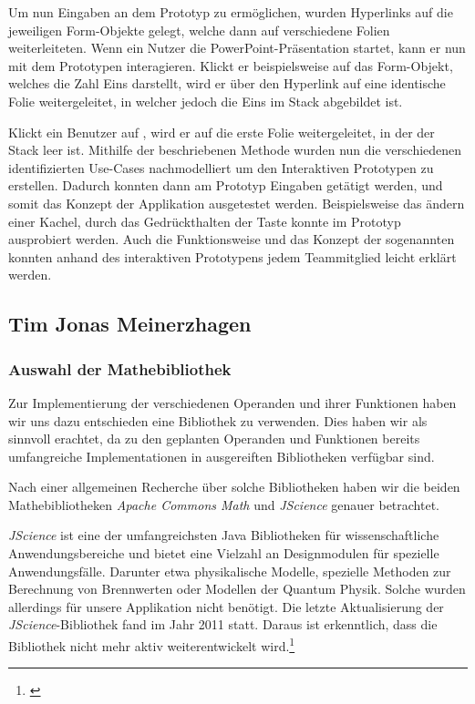 Um nun Eingaben an dem Prototyp zu ermöglichen, wurden Hyperlinks auf die jeweiligen Form-Objekte gelegt, welche dann auf verschiedene Folien weiterleiteten. Wenn ein Nutzer die PowerPoint-Präsentation startet, kann er nun mit dem Prototypen interagieren. Klickt er beispielsweise auf das Form-Objekt, welches die Zahl Eins darstellt, wird er über den Hyperlink auf eine identische Folie weitergeleitet, in welcher jedoch die Eins im Stack abgebildet ist. 

Klickt ein Benutzer auf , wird er auf die erste Folie weitergeleitet, in der der Stack leer ist. Mithilfe der beschriebenen Methode wurden nun die verschiedenen identifizierten Use-Cases nachmodelliert um den Interaktiven Prototypen zu erstellen. Dadurch konnten dann am Prototyp Eingaben getätigt werden, und somit das Konzept der Applikation ausgetestet werden. Beispielsweise das ändern einer Kachel, durch das Gedrückthalten der Taste konnte im Prototyp ausprobiert werden. Auch die Funktionsweise und das Konzept der sogenannten  konnten anhand des interaktiven Prototypens jedem Teammitglied leicht erklärt werden. 

\clearpage

\subsection{Tim Jonas Meinerzhagen}

\subsubsection{Auswahl der Mathebibliothek}

Zur Implementierung der verschiedenen Operanden und ihrer Funktionen haben wir uns dazu entschieden eine Bibliothek zu verwenden. Dies haben wir als sinnvoll erachtet, da zu den geplanten Operanden und Funktionen bereits umfangreiche Implementationen in ausgereiften Bibliotheken verfügbar sind.

Nach einer allgemeinen Recherche über solche Bibliotheken haben wir die beiden Mathebibliotheken \textit{Apache Commons Math} und \textit{JScience} genauer betrachtet.

\textit{JScience} ist eine der umfangreichsten Java Bibliotheken für wissenschaftliche Anwendungsbereiche und bietet eine Vielzahl an Designmodulen für spezielle Anwendungsfälle. Darunter etwa physikalische Modelle, spezielle Methoden zur Berechnung von Brennwerten oder Modellen der Quantum Physik. Solche wurden allerdings für unsere Applikation nicht benötigt. Die letzte Aktualisierung der \textit{JScience}-Bibliothek fand im Jahr 2011 statt. Daraus ist erkenntlich, dass die Bibliothek nicht mehr aktiv weiterentwickelt wird.\footnote{\cite[vgl.][]{dautelle2014}}

